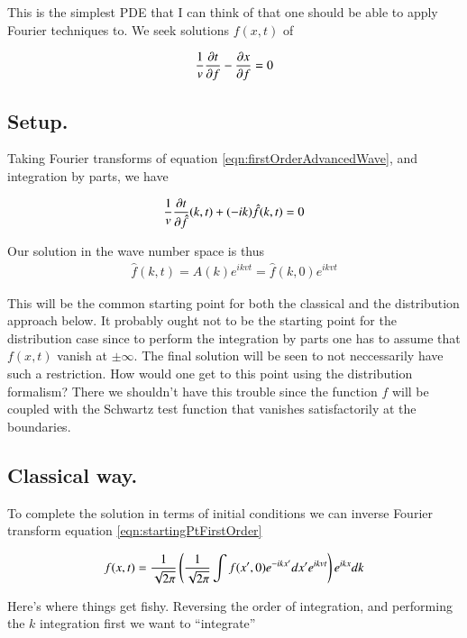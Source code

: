 \documentclass{article}
\begin{document}
This is the simplest PDE that I can think of that one should be able 
to apply Fourier techniques to.  We seek solutions $f(x,t)$ of

\begin{align}\label{eqn:firstOrderAdvancedWave}
\frac{1}{v} \frac{\partial{t}}{\partial {f}} - \frac{\partial{x}}{\partial {f}} = 0
\end{align}

\subsection{ Setup. }

Taking Fourier transforms of equation \ref{eqn:firstOrderAdvancedWave}, and integration
by parts, we have

\begin{align}
\frac{1}{v} \frac{\partial{t}}{\partial {\hat{f}}}(k,t) + (-ik)\hat{f}(k,t) = 0
\end{align}

Our solution in the wave number space is thus
\begin{align}\label{eqn:startingPtFirstOrder}
{\hat{f}}(k,t) = A(k) e^{i k v t} = \hat{f}(k,0) e^{i k v t}
\end{align}

This will be the common starting point for both the classical and the distribution approach below.
It probably ought not to be the starting point for the distribution case since to perform the
integration by parts one has to assume that $f(x,t)$ vanish at $\pm \infty$.
The final solution will be seen to not neccessarily have
such a restriction.  How would one get to this point using the distribution formalism?  There we
shouldn't have this trouble since the function $f$ will be coupled with the Schwartz test function
that vanishes satisfactorily at the boundaries.

\subsection{ Classical way. }

To complete the solution in terms of initial conditions we can inverse Fourier transform
equation \ref{eqn:startingPtFirstOrder}

\begin{align*}
{{f}}(x,t) = \frac{1}{\sqrt{2\pi}} \left( \frac{1}{\sqrt{2\pi}}\int f(x',0) e^{-i k x'} dx' e^{i k v t} \right) e^{ i k x } dk
\end{align*}

Here's where things get fishy.  Reversing the order of integration, and performing
the $k$ integration first we want to ``integrate''
\end{document}
